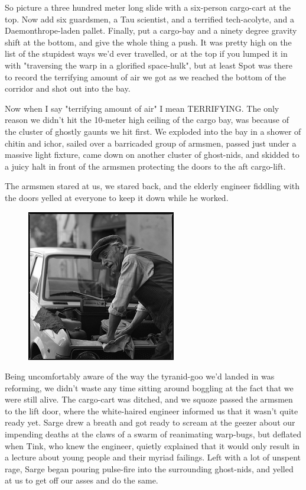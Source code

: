 So picture a three hundred meter long slide with a six-person cargo-cart at the top. 
Now add six guardsmen, a Tau scientist, and a terrified tech-acolyte, and a Daemonthrope-laden pallet. 
Finally, put a cargo-bay and a ninety degree gravity shift at the bottom, and give the whole thing a push. 
It was pretty high on the list of the stupidest ways we'd ever travelled, or at the top if you lumped it in with "traversing the warp in a glorified space-hulk", but at least Spot was there to record the terrifying amount of air we got as we reached the bottom of the corridor and shot out into the bay.

Now when I say "terrifying amount of air" I mean TERRIFYING. 
The only reason we didn't hit the 10-meter high ceiling of the cargo bay, was because of the cluster of ghostly gaunts we hit first. 
We exploded into the bay in a shower of chitin and ichor, sailed over a barricaded group of armsmen, passed just under a massive light fixture, came down on another cluster of ghost-nids, and skidded to a juicy halt in front of the armsmen protecting the doors to the aft cargo-lift.

The armsmen stared at us, we stared back, and the elderly engineer fiddling with the doors yelled at everyone to keep it down while he worked.

\begin{figure}
	\begin{center}
		\includegraphics[width=\figwidth]{pics/15/55.png}
	\end{center}
\end{figure}
Being uncomfortably aware of the way the tyranid-goo we'd landed in was reforming, we didn't waste any time sitting around boggling at the fact that we were still alive. 
The cargo-cart was ditched, and we squoze passed the armsmen to the lift door, where the white-haired engineer informed us that it wasn't quite ready yet. 
Sarge drew a breath and got ready to scream at the geezer about our impending deaths at the claws of a swarm of reanimating warp-bugs, but deflated when Tink, who knew the engineer, quietly explained that it would only result in a lecture about young people and their myriad failings. 
Left with a lot of unspent rage, Sarge began pouring pulse-fire into the surrounding ghost-nids, and yelled at us to get off our asses and do the same.

